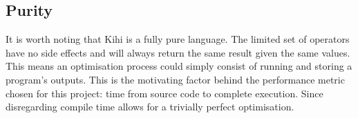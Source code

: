 \subsection{Purity}
It is worth noting that Kihi is a fully pure language. The limited set of operators have no side effects and will always return the same result given the same values. This means an optimisation process could simply consist of running and storing a program's outputs. This is the motivating factor behind the performance metric chosen for this project: time from source code to complete execution. Since disregarding compile time allows for a trivially perfect optimisation.





